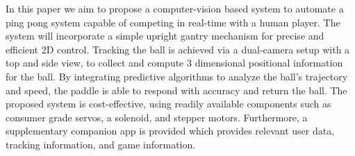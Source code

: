 In this paper we aim to propose a computer-vision based system to automate a ping pong system capable of competing in real-time with a human player. The system will incorporate a simple upright gantry mechanism for precise and efficient 2D control. Tracking the ball is achieved via a dual-camera setup with a top and side view, to collect and compute 3 dimensional positional information for the ball. By integrating predictive algorithms to analyze the ball's trajectory and speed, the paddle is able to respond with accuracy and return the ball. The proposed system is cost-effective, using readily available components such as consumer grade servos, a solenoid, and stepper motors. Furthermore, a supplementary companion app is provided which provides relevant user data, tracking information, and game information.